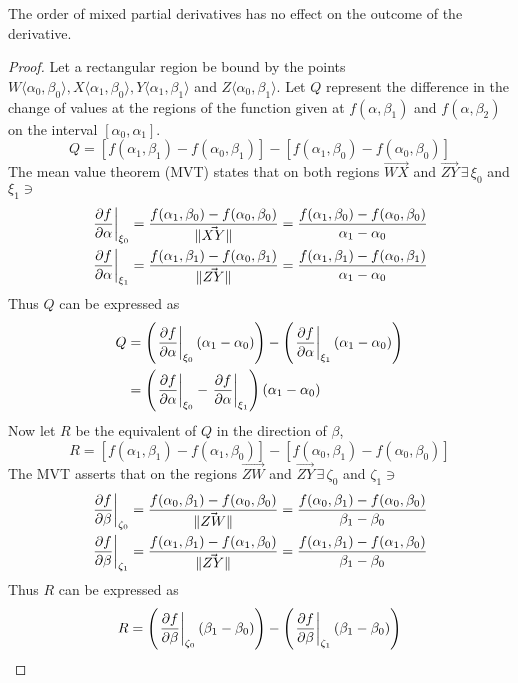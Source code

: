 \begin{lemma}
	The order of mixed partial derivatives has no effect on the outcome of the derivative.
	\begin{proof}
		Let a rectangular region be bound by the points $W\langle \alpha_0,\beta_0\rangle,X\langle \alpha_1,\beta_0\rangle,
		Y\langle \alpha_1,\beta_1\rangle$ and $Z\langle \alpha_0,\beta_1\rangle$. Let $Q$ represent the difference in the
		change of values at the regions of the function given at $f(\alpha,\beta_1)$ and $f(\alpha,\beta_2)$ on the
		interval $[\alpha_0,\alpha_1]$.
		$$
		Q=[f(\alpha_1,\beta_1)-f(\alpha_0,\beta_1)]-[f(\alpha_1,\beta_0)-f(\alpha_0,\beta_0)]
		$$
		The mean value theorem (MVT) states that on both regions $\vec{WX}$ and $\vec{ZY}\,\exists\,\xi_0$ and $\xi_1\ni$
		\begin{align*}
			\eval{\pdv{f}{\alpha}}_{\xi_0}&=\frac{f(\alpha_1,\beta_0)-f(\alpha_0,\beta_0)}{\lVert\vec{XY}\rVert}=\frac{f(\alpha_1,\beta_0)-f(\alpha_0,\beta_0)}{\alpha_1-\alpha_0}\\
			\eval{\pdv{f}{\alpha}}_{\xi_1}&=\frac{f(\alpha_1,\beta_1)-f(\alpha_0,\beta_1)}{\lVert\vec{ZY}\rVert}=\frac{f(\alpha_1,\beta_1)-f(\alpha_0,\beta_1)}{\alpha_1-\alpha_0}
		\end{align*}
		Thus $Q$ can be expressed as
		\begin{align*}
			Q&=\left(\eval{\pdv{f}{\alpha}}_{\xi_0}\left(\alpha_1-\alpha_0\right)\right)-\left(\eval{\pdv{f}{\alpha}}_{\xi_1}\left(\alpha_1-\alpha_0\right)\right)\\
			&=\left(\eval{\pdv{f}{\alpha}}_{\xi_0}-\eval{\pdv{f}{\alpha}}_{\xi_1}\right)\left(\alpha_1-\alpha_0\right)
		\end{align*}
		Now let $R$ be the equivalent of $Q$ in the direction of $\beta$,
		$$
			R=[f(\alpha_1,\beta_1)-f(\alpha_1,\beta_0)]-[f(\alpha_0,\beta_1)-f(\alpha_0,\beta_0)]
		$$
		The MVT asserts that on the regions $\vec{ZW}$ and $\vec{ZY}\,\exists\,\zeta_0$ and $\zeta_1\ni$
		\begin{align*}
			\eval{\pdv{f}{\beta}}_{\zeta_0}&=\frac{f(\alpha_0,\beta_1)-f(\alpha_0,\beta_0)}{\lVert\vec{ZW}\rVert}=\frac{f(\alpha_0,\beta_1)-f(\alpha_0,\beta_0)}{\beta_1-\beta_0}\\
			\eval{\pdv{f}{\beta}}_{\zeta_1}&=\frac{f(\alpha_1,\beta_1)-f(\alpha_1,\beta_0)}{\lVert\vec{ZY}\rVert}=\frac{f(\alpha_1,\beta_1)-f(\alpha_1,\beta_0)}{\beta_1-\beta_0}
		\end{align*}
		Thus $R$ can be expressed as
		\begin{align*}
			R&=\left(\eval{\pdv{f}{\beta}}_{\zeta_0}\left(\beta_1-\beta_0\right)\right)-\left(\eval{\pdv{f}{\beta}}_{\zeta_1}\left(\beta_1-\beta_0\right)\right)\\

\end{align*}
\end{proof}
\end{lemma}
